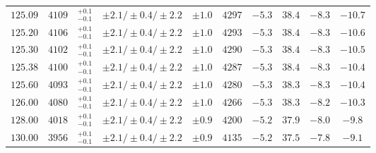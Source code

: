 \begin{table}[ht!]
\begin{center}
\begin{small}
\begin{tabular}{cccccccc|cc}
$125.09$ & $4109$ & $^{+0.1}_{-0.1}$ & $\pm 2.1/\pm 0.4/\pm 2.2$ & $\pm 1.0$ & $4297$ & $-5.3$ & $38.4$ & $-8.3$ & $-10.7$ \\
$125.20$ & $4106$ & $^{+0.1}_{-0.1}$ & $\pm 2.1/\pm 0.4/\pm 2.2$ & $\pm 1.0$ & $4293$ & $-5.3$ & $38.4$ & $-8.3$ & $-10.6$ \\
$125.30$ & $4102$ & $^{+0.1}_{-0.1}$ & $\pm 2.1/\pm 0.4/\pm 2.2$ & $\pm 1.0$ & $4290$ & $-5.3$ & $38.4$ & $-8.3$ & $-10.5$ \\
$125.38$ & $4100$ & $^{+0.1}_{-0.1}$ & $\pm 2.1/\pm 0.4/\pm 2.2$ & $\pm 1.0$ & $4287$ & $-5.3$ & $38.4$ & $-8.3$ & $-10.4$ \\
$125.60$ & $4093$ & $^{+0.1}_{-0.1}$ & $\pm 2.1/\pm 0.4/\pm 2.2$ & $\pm 1.0$ & $4280$ & $-5.3$ & $38.3$ & $-8.3$ & $-10.4$ \\
$126.00$ & $4080$ & $^{+0.1}_{-0.1}$ & $\pm 2.1/\pm 0.4/\pm 2.2$ & $\pm 1.0$ & $4266$ & $-5.3$ & $38.3$ & $-8.2$ & $-10.3$ \\
$128.00$ & $4018$ & $^{+0.1}_{-0.1}$ & $\pm 2.1/\pm 0.4/\pm 2.2$ & $\pm 0.9$ & $4200$ & $-5.2$ & $37.9$ & $-8.0$ & $-9.8 $ \\
$130.00$ & $3956$ & $^{+0.1}_{-0.1}$ & $\pm 2.1/\pm 0.4/\pm 2.2$ & $\pm 0.9$ & $4135$ & $-5.2$ & $37.5$ & $-7.8$ & $-9.1 $ \\
\bottomrule
\end{tabular}%
\end{small}%
\end{center}%
\end{table}

